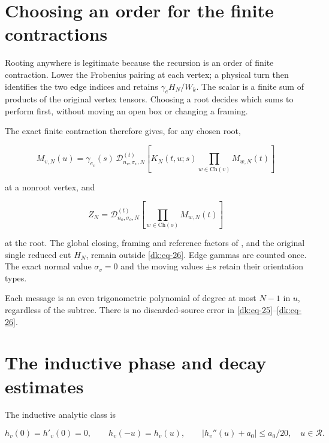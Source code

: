 \section{Choosing an order for the finite contractions}\label{dk:sec-3}

Rooting anywhere is legitimate because the recursion is an order of
finite contraction. Lower the Frobenius pairing at each vertex; a
physical turn then identifies the two edge indices and retains
\(\gamma_e H_N/W_k\). The scalar is a finite sum of products of the
original vertex tensors. Choosing a root decides which sums to perform
first, without moving an open box or changing a framing.

The exact finite contraction therefore gives, for any chosen root,

\begin{equation}\label{dk:eq-25}
M_{v,N}(u)=\gamma_{e_v}(s)\,
 \mathcal D_{n_v,\sigma_v,N}^{(t)}
 \left[K_N(t,u;s)\prod_{w\in\mathrm{Ch}(v)}M_{w,N}(t)\right]
\end{equation}

at a nonroot vertex, and

\begin{equation}\label{dk:eq-26}
Z_N=\mathcal D_{n_o,\sigma_o,N}^{(t)}
                  \left[\prod_{w\in\mathrm{Ch}(o)}M_{w,N}(t)\right]
\end{equation}

at the root. The global closing, framing and reference factors of
\cite[Proposition~8.1]{MeridianTangles},
and the original single reduced cut \(H_N\), remain outside \eqref{dk:eq-26}. Edge
gammas are counted once. The exact normal value \(\sigma_v=0\) and the moving
values \(\pm s\) retain their orientation types.

Each message is an even trigonometric polynomial of degree at most \(N-1\)
in \(u\), regardless of the subtree. There is no discarded-source error in
\eqref{dk:eq-25}--\eqref{dk:eq-26}.

\section{The inductive phase and decay estimates}\label{dk:sec-4}

The inductive analytic class is

\begin{equation}\label{dk:eq-27}
h_v(0)=h'_v(0)=0,\qquad h_v(-u)=h_v(u),\qquad
 |h_v''(u)+a_0|\le a_0/20,\quad u\in\mathcal R.
\end{equation}

